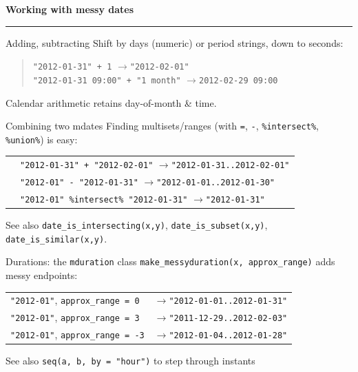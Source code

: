 \documentclass[9pt]{extarticle}
\let\code\verb
\newcommand{\arrow}{\;\textcolor{mddark}{$\rightarrow$}\;}
\newcommand{\colhead}[2]{%
  {\color{mdbrown}\bfseries\large #1\; #2}\\[-4pt]
  {\color{mddark}\rule{\linewidth}{1.2pt}}\vspace{1pt}}
\begin{document}
%
\begin{minipage}[t]{0.323\textwidth}
\colhead{\faCogs}{Working with messy dates}

\begin{mdbox}{Adding, subtracting}
Shift by days (numeric) or period strings, down to seconds:
\begin{quote}
\code|"2012-01-31" + 1| \arrow \code|"2012-02-01"|\\
\code|"2012-01-31 09:00" + "1 month"| \arrow \code|2012-02-29 09:00|
\end{quote}
Calendar arithmetic retains day-of-month \& time.
\end{mdbox}

\begin{mdbox}{Combining two mdates}
Finding multisets/ranges (with \code|=|, \code|-|, \code|%
\begin{tabular}{@{}ll@{}}
& \code|"2012-01-31" + "2012-02-01"| \arrow \code|"2012-01-31..2012-02-01"|\\
& \code|"2012-01" - "2012-01-31"| \arrow \code|"2012-01-01..2012-01-30"|\\
& \code|"2012-01" %
\end{tabular}

See also \code|date_is_intersecting(x,y)|, \code|date_is_subset(x,y)|, \code|date_is_similar(x,y)|.
\end{mdbox}

\begin{mdbox}{Durations: the \texttt{mduration} class}
\code|make_messyduration(x, approx_range)| adds messy endpoints:
\begin{center}
\begin{tabular}{@{}ll@{}}
\code|"2012-01"|, \code|approx_range = 0| & \arrow \code|"2012-01-01..2012-01-31"|\\
\code|"2012-01"|, \code|approx_range = 3| & \arrow \code|"2011-12-29..2012-02-03"|\\
\code|"2012-01"|, \code|approx_range = -3| & \arrow \code|"2012-01-04..2012-01-28"|\\
\end{tabular}
\end{center}
See also \code|seq(a, b, by = "hour")| to step through instants
\end{mdbox}


\end{minipage}
\end{document}
